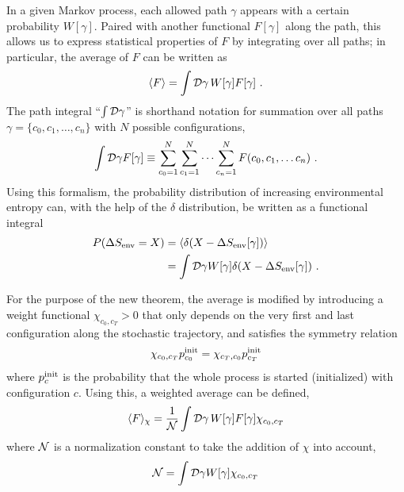 In a given Markov process, each allowed path \(\gamma\) appears with a certain probability \(W[\gamma]\). Paired with another functional \(F[\gamma]\) along the path, this allows us to express statistical properties of \(F\) by integrating over all paths; in particular, the average of \(F\) can be written as
%
\begin{align}
	\label{eqn:functional average}
	\langle F\rangle = \int \mathcal{D} \gamma\, W[\gamma] F[\gamma] ~.
\end{align}
%
The path integral ``\(\int \mathcal{D}\gamma\)'' is shorthand notation for summation over all paths \(\gamma = \{c_0, c_1, \ldots, c_n\}\) with \(N\) possible configurations,
%
\begin{align}
	\int \mathcal{D}\gamma F[\gamma]
	\equiv
	\sum_{c_0=1}^N\sum_{c_1=1}^N\cdots\sum_{c_n=1}^N F(c_0, c_1, \ldots c_n) ~.
\end{align}
%
Using this formalism, the probability distribution of increasing environmental entropy can, with the help of the \(\delta\) distribution, be written as a functional integral
%
\begin{equation}
	\begin{split}
	P(\Delta S_\text{env} = X)
	&= \langle \delta(X-\Delta S_\text{env}[\gamma])\rangle \\
	&= \int\mathcal{D}\gamma W[\gamma] \delta(X-\Delta S_\text{env}[\gamma])
	~.
	\end{split}
\end{equation}

For the purpose of the new theorem, the average  is modified by introducing a weight functional \(\chi_{c_0,c_T} > 0\) that only depends on the very first and last configuration along the stochastic trajectory, and satisfies the symmetry relation
%
\begin{align}
	\label{eqn:chi symmetry}
	\chi_{c_0,c_T}p_{c_0}^{\text{init}} = \chi_{c_T,c_0}p_{c_T}^{\text{init}}
\end{align}
%
where \(p_c^{\text{init}}\) is the probability that the whole process is started (initialized) with configuration \(c\). Using this, a weighted average can be defined,
%
\begin{align}
	\label{eqn:weighted functional average}
	\langle F\rangle_\chi
	= \frac1{\mathcal{N}} \int \mathcal{D} \gamma\, W[\gamma] F[\gamma] \chi_{c_0,c_T}
\end{align}
%
where \(\mathcal{N}\) is a normalization constant to take the addition of \(\chi\) into account,
%
\begin{align}
	\label{eqn:weighted normalized}
	\mathcal{N} = \int\mathcal{D}\gamma W[\gamma] \chi_{c_0,c_T}
\end{align}


